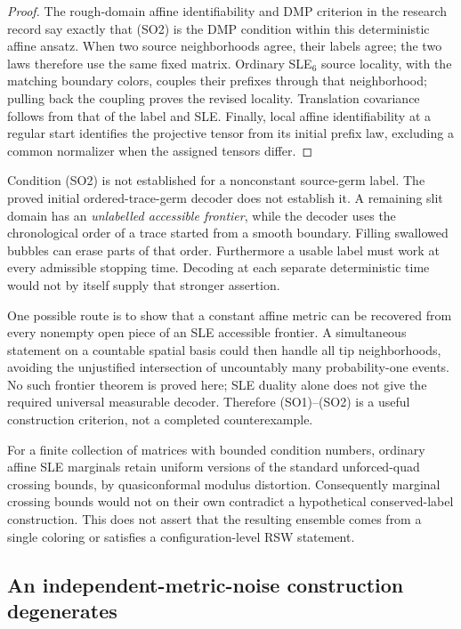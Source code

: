\documentclass[11pt]{article}
\theoremstyle{definition}\newtheorem{definition}[theorem]{Definition}
\theoremstyle{remark}\newtheorem{remark}[theorem]{Remark}
\begin{document}
\begin{proof}
The rough-domain affine identifiability and DMP criterion in the research
record say exactly that (SO2) is the DMP condition within this deterministic
affine ansatz.  When two source neighborhoods agree, their labels agree;
the two laws therefore use the same fixed matrix.  Ordinary SLE$_6$
source locality, with the matching boundary colors, couples their prefixes
through that neighborhood; pulling back the coupling proves the revised
locality.  Translation covariance follows from that of the label and SLE.
Finally, local affine identifiability at a regular start identifies the
projective tensor from its initial prefix law, excluding a common normalizer
when the assigned tensors differ.
\end{proof}

Condition (SO2) is not established for a nonconstant source-germ label.
The proved initial ordered-trace-germ decoder does not establish it.  A
remaining slit domain has an \emph{unlabelled accessible frontier}, while the
decoder uses the chronological order of a trace started from a smooth
boundary.  Filling swallowed bubbles can erase parts of that order.
Furthermore a usable label must work at every admissible stopping time.
Decoding at each separate deterministic time would not by itself supply
that stronger assertion.

One possible route is to show that a constant affine metric can be recovered
from every nonempty open piece of an SLE accessible frontier.  A simultaneous
statement on a countable spatial basis could then handle all tip
neighborhoods, avoiding the unjustified intersection of uncountably many
probability-one events.  No such frontier theorem is proved here; SLE duality
alone does not give the required universal measurable decoder.  Therefore
(SO1)--(SO2) is a useful construction criterion, not a completed counterexample.

For a finite collection of matrices with bounded condition numbers,
ordinary affine SLE marginals retain uniform versions of the standard
unforced-quad crossing bounds, by quasiconformal modulus distortion.
Consequently marginal crossing bounds would not on their own contradict
a hypothetical conserved-label construction.  This does not assert that
the resulting ensemble comes from a single coloring or satisfies a
configuration-level RSW statement.

\subsection{An independent-metric-noise construction degenerates}
\end{document}
